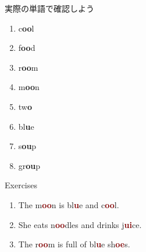 \documentclass[aspectratio=169,xcolor={dvipsnames,table}]{beamer}
\begin{document}
\begin{frame}[plain]{実際の単語で確認しよう}
\LARGE

\begin{enumerate}
 \item c\textcolor{NavyBlue}{\bfseries oo}l%
\hfill{}\hspace{150pt}\mbox{}
 \item f\textcolor{NavyBlue}{\bfseries oo}d%
\hfill{}\hspace{150pt}\mbox{}
\item r\textcolor{NavyBlue}{\bfseries oo}m%
\hfill{}\hspace{150pt}\mbox{}
 \item m\textcolor{NavyBlue}{\bfseries oo}n%
\hfill{}\hspace{150pt}\mbox{}
 \item tw\textcolor{NavyBlue}{\bfseries o}%
\hfill{}\hspace{150pt}\mbox{}
 \item bl\textcolor{NavyBlue}{\bfseries u}e%
\hfill{}\hspace{150pt}\mbox{} 
 \item s\textcolor{NavyBlue}{\bfseries ou}p%
\hfill{}\hspace{150pt}\mbox{}
 \item gr\textcolor{NavyBlue}{\bfseries ou}p%
\hfill{}\hspace{150pt}\mbox{}
\end{enumerate}
\end{frame}
\begin{frame}[plain]{Exercises}
\LARGE
\begin{enumerate}
 \item The m\textcolor{Maroon}{\bfseries oo}n is bl\textcolor{Maroon}{\bfseries u}e and c\textcolor{Maroon}{\bfseries oo}l.
 \item She eats n\textcolor{Maroon}{\bfseries oo}dles and drinks j\textcolor{Maroon}{\bfseries ui}ce.
 \item The r\textcolor{Maroon}{\bfseries oo}m is full of bl\textcolor{Maroon}{\bfseries u}e sh\textcolor{Maroon}{\bfseries oe}s.

\end{enumerate}
\end{frame}
\end{document}
